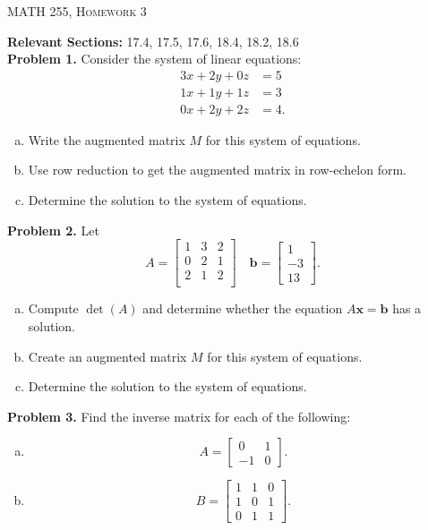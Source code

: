 \documentclass[12pt]{report} %
\theoremstyle{definition}
\begin{document}
\begin{center}
   \textsc{\large MATH 255, Homework 3}\\
\end{center}
\vspace{.5cm}

\noindent\textbf{Relevant Sections:} 17.4, 17.5, 17.6, 18.4, 18.2, 18.6 \\

\noindent\textbf{Problem 1.} Consider the system of linear equations:
\begin{align*}
    3x+2y+0z&=5\\
    1x+1y+1z&=3\\
    0x+2y+2z&=4.
\end{align*}
\begin{enumerate}[(a)]
    \item Write the augmented matrix $M$ for this system of equations.
    \item Use row reduction to get the augmented matrix in row-echelon form.
    \item Determine the solution to the system of equations.
\end{enumerate}

\noindent\textbf{Problem 2.} Let
\[
A=\begin{bmatrix} 1 & 3 & 2 \\ 0 & 2 & 1\\ 2 & 1 & 2\\ \end{bmatrix} \quad \mathbf{b}= \begin{bmatrix} 1 \\ -3 \\ 13 \end{bmatrix}.
\]
\begin{enumerate}[(a)]
    \item Compute $\det(A)$ and determine whether the equation $A\mathbf{x}=\mathbf{b}$ has a solution.
    \item Create an augmented matrix $M$ for this system of equations.
    \item Determine the solution to the system of equations.
\end{enumerate}

\noindent\textbf{Problem 3.} Find the inverse matrix for each of the following:
\begin{enumerate}[(a)]
    \item \[
    A=\begin{bmatrix} 0 & 1 \\ -1 & 0 \end{bmatrix}.
    \]
    \item \[
    B=\begin{bmatrix} 1 & 1 & 0\\ 1 & 0 & 1 \\ 0 & 1 & 1 \end{bmatrix}.
    \]
\end{enumerate}
\end{document}
